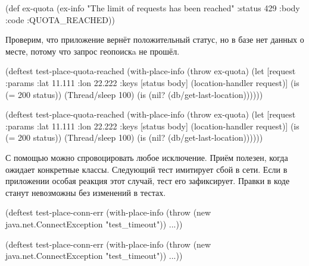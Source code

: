 \else

\begin{clojure}
(def ex-quota
  (ex-info "The limit of requests has been reached"
           {:status 429 :body {:code :QUOTA_REACHED}}))
\end{clojure}

\fi

Проверим, что приложение вернёт положительный статус, но в базе нет данных о
месте, потому что запрос геопоискa не прошёл.

\ifnarrow

\begin{clojure}
(deftest test-place-quota-reached
 (with-place-info
   (throw ex-quota)
   (let [request {:params {:lat 11.111
                          :lon 22.222}}
        {:keys [status body]}
        (location-handler request)]
      (is (= 200 status))
      (Thread/sleep 100)
      (is (nil?
            (db/get-last-location))))))
\end{clojure}

\else

\begin{clojure}
(deftest test-place-quota-reached
  (with-place-info
    (throw ex-quota)
    (let [request {:params {:lat 11.111 :lon 22.222}}
          {:keys [status
                  body]} (location-handler request)]
      (is (= 200 status))
      (Thread/sleep 100)
      (is (nil? (db/get-last-location))))))
\end{clojure}

\fi

С помощью  можно спровоцировать любое исключение. Приём
полезен, когда  ожидает конкретные классы. Следующий тест имитирует
сбой в сети. Если в приложении особая реакция этот случай, тест его
зафиксирует. Правки в коде станут невозможны без изменений в тестах.


\ifnarrow

\begin{clojure}
(deftest test-place-conn-err
  (with-place-info
    (throw (new java.net.ConnectException
             "test_timeout"))
    ...))
\end{clojure}

\else

\begin{clojure}
(deftest test-place-conn-err
  (with-place-info
    (throw (new java.net.ConnectException "test_timeout"))
    ...))
\end{clojure}

